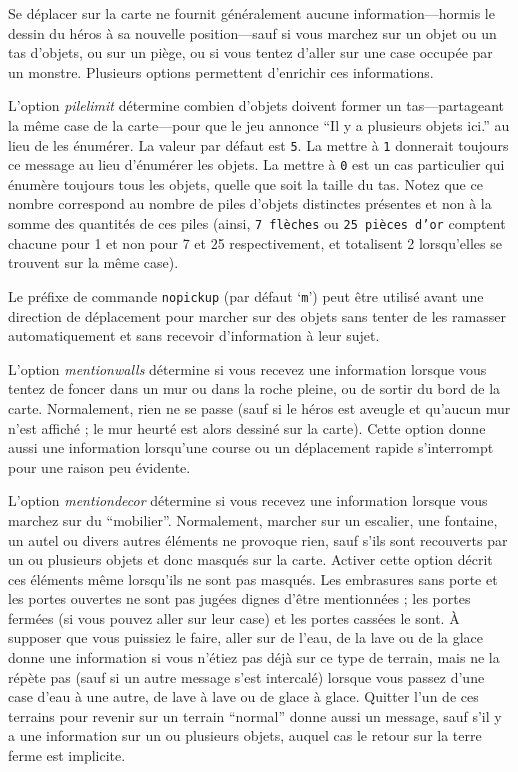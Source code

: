 \documentclass[titlepage]{article}
\begin{document}
Se déplacer sur la carte ne fournit généralement aucune
information---hormis le dessin du héros à sa nouvelle position---sauf
si vous marchez sur un objet ou un tas d'objets,
ou sur un piège, ou si vous tentez d'aller sur une case occupée par un monstre.
Plusieurs options permettent d'enrichir ces informations.

L'option
\textit{pile\textunderscore limit}
détermine combien d'objets doivent former un
tas---partageant la même case de la carte---pour
que le jeu annonce ``Il y a plusieurs objets ici.'' au lieu de les énumérer.
La valeur par défaut est \texttt{5}.
La mettre à \texttt{1} donnerait toujours ce message au lieu d'énumérer
les objets.
La mettre à \texttt{0} est un cas particulier qui énumère toujours tous
les objets, quelle que soit la taille du tas.
Notez que ce nombre correspond au nombre de piles d'objets distinctes
présentes et non à la somme des quantités de ces piles (ainsi,
\texttt{7 flèches} ou \texttt{25 pièces d'or} comptent chacune pour 1 et non
pour 7 et 25 respectivement, et totalisent 2 lorsqu'elles se trouvent sur la
même case).

Le préfixe de commande \texttt{nopickup} (par défaut `\texttt{m}') peut
être utilisé avant une direction de déplacement pour marcher sur des objets sans
tenter de les ramasser automatiquement et sans recevoir d'information à leur sujet.

L'option
\textit{mention\textunderscore walls}
détermine si vous recevez une information lorsque vous tentez de foncer dans un mur
ou dans la roche pleine, ou de sortir du bord de la carte.
Normalement, rien ne se passe (sauf si le héros est aveugle et qu'aucun mur n'est
affiché ; le mur heurté est alors dessiné sur la carte).
Cette option donne aussi une information lorsqu'une course ou un déplacement
rapide s'interrompt pour une raison peu évidente.

L'option
\textit{mention\textunderscore decor}
détermine si vous recevez une information lorsque vous marchez sur du ``mobilier''.
Normalement, marcher sur un escalier, une fontaine, un autel ou divers autres
éléments ne provoque rien, sauf s'ils sont recouverts par un ou plusieurs objets
et donc masqués sur la carte.
Activer cette option décrit ces éléments même lorsqu'ils
ne sont pas masqués.
Les embrasures sans porte et les portes ouvertes ne sont pas jugées dignes d'être
mentionnées ; les portes fermées (si vous pouvez aller sur leur case) et les
portes cassées le sont.
À supposer que vous puissiez le faire, aller sur de l'eau, de la lave ou de la glace
donne une information si vous n'étiez pas déjà sur ce type de terrain, mais ne la
répète pas (sauf si un autre message s'est intercalé) lorsque vous passez d'une case
d'eau à une autre, de lave à lave ou de glace à glace.
Quitter l'un de ces terrains pour revenir sur un terrain ``normal'' donne aussi
un message, sauf s'il y a une information sur un ou plusieurs objets, auquel
cas le retour sur la terre ferme est implicite.
\end{document}
